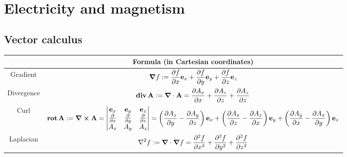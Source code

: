 \documentclass[../../../main.tex]{subfiles}
\begin{document}
\section{Electricity and magnetism}
\subsection{Vector calculus}
\begin{center}
  \begin{tabular}{|c|c|}

    \hline
               & Formula (in Cartesian coordinates)                                                                                                                                                                                                                                                                                                         \\
    \hline
    Gradient   & $\displaystyle\grad f:=\frac{\partial f}{\partial x}\boldsymbol{\mathrm{e}}_x+\frac{\partial f}{\partial y}\boldsymbol{\mathrm{e}}_y+\frac{\partial f}{\partial z}\boldsymbol{\mathrm{e}}_z$                                                                                                                                                                                                  \\
    \hline
    Divergence & $\displaystyle\operatorname{\boldsymbol{\mathrm{div}}} \boldsymbol{\mathrm{A}}:=\grad\cdot\boldsymbol{\mathrm{A}}=\frac{\partial A_x}{\partial x}+\frac{\partial A_z}{\partial z}+\frac{\partial A_z}{\partial z}$                                                                                                                                                                                               \\
    \hline
    Curl       & $\displaystyle\rot \vf{A}:=\grad\crossprod\vf{A}=\begin{vmatrix}
        \vf{e}_x                    & \vf{e}_y                    & \vf{e}_z                    \\
        \frac{\partial}{\partial x} & \frac{\partial}{\partial y} & \frac{\partial}{\partial z} \\
        A_x                         & A_y                         & A_z                         \\
      \end{vmatrix}=\left(\frac{\partial A_z}{\partial y}-\frac{\partial A_y}{\partial z}\right)\vf{e}_x+\left(\frac{\partial A_x}{\partial z}-\frac{\partial A_z}{\partial x}\right)\vf{e}_y+\left(\frac{\partial A_y}{\partial x}-\frac{\partial A_x}{\partial y}\right)\vf{e}_z$ \\
    \hline
    Laplacian  & $\displaystyle\laplacian f:=\grad\cdot\grad f=\frac{\partial^2f}{\partial x^2}+\frac{\partial^2f}{\partial y^2}+\frac{\partial^2f}{\partial z^2}$                                                                                                                                                                                          \\
    \hline
  \end{tabular}
\end{center}
\end{document}
